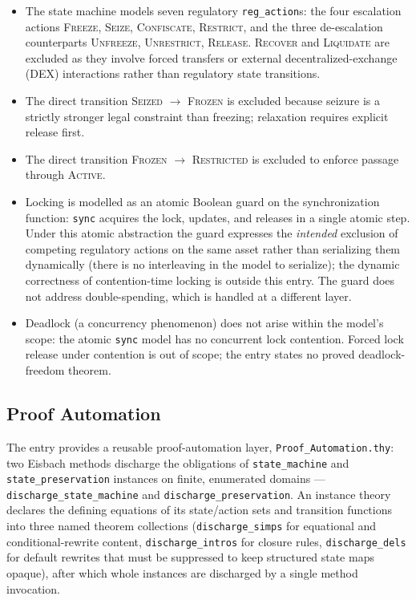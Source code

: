 \documentclass[11pt,a4paper]{article}
\begin{document}
\begin{itemize}
\item The state machine models seven regulatory \texttt{reg\_action}s: the
  four escalation actions \textsc{Freeze}, \textsc{Seize},
  \textsc{Confiscate}, \textsc{Restrict}, and the three de-escalation
  counterparts \textsc{Unfreeze}, \textsc{Unrestrict}, \textsc{Release}.
  \textsc{Recover} and \textsc{Liquidate} are excluded as they involve
  forced transfers or external decentralized-exchange (DEX) interactions
  rather than regulatory state transitions.
\item The direct transition \textsc{Seized} $\to$ \textsc{Frozen} is
  excluded because seizure is a strictly stronger legal constraint than
  freezing; relaxation requires explicit release first.
\item The direct transition \textsc{Frozen} $\to$ \textsc{Restricted}
  is excluded to enforce passage through \textsc{Active}.
\item Locking is modelled as an atomic Boolean guard on the synchronization
  function: \texttt{sync} acquires the lock, updates, and releases in a
  single atomic step.  Under this atomic abstraction the guard expresses the
  \emph{intended} exclusion of competing regulatory actions on the same
  asset rather than serializing them dynamically (there is no interleaving
  in the model to serialize); the dynamic correctness of contention-time
  locking is outside this entry.  The guard does not address
  double-spending, which is handled at a different layer.
\item Deadlock (a concurrency phenomenon) does not arise within the model's
  scope: the atomic \texttt{sync} model has no concurrent lock contention.
  Forced lock release under contention is out of scope; the entry states no proved
  deadlock-freedom theorem.
\end{itemize}

\subsection{Proof Automation}

The entry provides a reusable proof-automation layer,
\texttt{Proof\_Automation.thy}: two Eisbach methods discharge the
obligations of \texttt{state\_machine} and \texttt{state\_preservation}
instances on finite, enumerated domains ---
\texttt{discharge\_state\_machine} and \texttt{discharge\_preservation}.  An
instance theory declares the defining equations of its state/action sets and
transition functions into three named theorem collections
(\texttt{discharge\_simps} for equational and conditional-rewrite content,
\texttt{discharge\_intros} for closure rules, \texttt{discharge\_dels} for
default rewrites that must be suppressed to keep structured state maps
opaque), after which whole instances are discharged by a single method
invocation.
\end{document}
